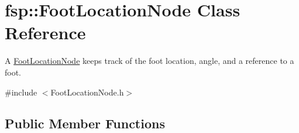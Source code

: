 \hypertarget{classfsp_1_1_foot_location_node}{\section{fsp\-:\-:Foot\-Location\-Node Class Reference}
\label{classfsp_1_1_foot_location_node}
}


A \hyperlink{classfsp_1_1_foot_location_node}{Foot\-Location\-Node} keeps track of the foot location, angle, and a reference to a foot.  




{\ttfamily \#include $<$Foot\-Location\-Node.\-h$>$}

\subsection*{Public Member Functions}
